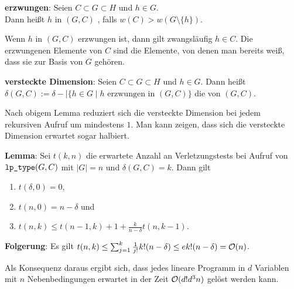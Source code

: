 \textbf{erzwungen}:
Seien $C \subset G \subset H$ und $h \in G$.\\
Dann heißt $h$ in $(G, C)$ , falls $w(C) > w(G \setminus \{h\})$.

Wenn $h$ in $(G, C)$ erzwungen ist, dann gilt zwangsläufig $h \in C$.
Die erzwungenen Elemente von $C$ sind die Elemente, von denen man bereits weiß, dass sie zur
Basis von $G$ gehören.

\textbf{versteckte Dimension}:
Seien $C \subset G \subset H$ und $h \in G$.
Dann heißt\\
$\delta(G, C) := \delta - |\{h \in G \;|\; \text{$h$ erzwungen in $(G, C)$}\}$
die  von $(G, C)$.

Nach obigem Lemma reduziert sich die versteckte Dimension bei jedem rekursiven Aufruf um
mindestens $1$.
Man kann zeigen, dass sich die versteckte Dimension erwartet sogar halbiert.

\linie

\textbf{Lemma}:
Sei $t(k, n)$ die erwartete Anzahl an Verletzungstests bei Aufruf von $\texttt{lp\_type}(G, C)$ mit
$|G| = n$ und $\delta(G, C) = k$.
Dann gilt
\begin{enumerate}
    \item
    $t(\delta, 0) = 0$,

    \item
    $t(n, 0) = n - \delta$ und

    \item
    $t(n, k) \le t(n - 1, k) + 1 + \frac{k}{n - \delta} t(n, k - 1)$.
\end{enumerate}

\textbf{Folgerung}:
Es gilt $t(n, k) \le \sum_{j=1}^k \frac{1}{j!} k! (n - \delta) \le e k! (n - \delta) = \mathcal{O}(n)$.

Als Konsequenz daraus ergibt sich, dass jedes lineare Programm in $d$ Variablen mit $n$
Nebenbedingungen erwartet in der Zeit $\mathcal{O}(d! d^3 n)$ gelöst werden kann.

\pagebreak
